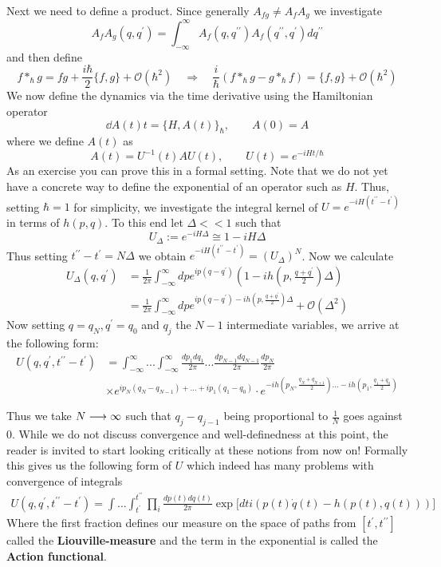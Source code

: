 \begin{example}
  Next we need to define a product. Since generally $A_{fg} \neq A_f A_g$ we investigate
  $$ A_f A_g (q, q^\prime) = \int_{-\infty}^\infty A_f(q, q^{\prime \prime}) A_f(q^{\prime \prime},q^\prime) dq^{\prime \prime} $$
  and then define
  $$ f *_\hbar g = fg + \frac{i\hbar}{2} \{f,g\} + \mathcal{O}(\hbar^2) \quad \Rightarrow \quad \frac{i}{\hbar} (f *_\hbar g - g *_\hbar f) = \{f,g\} + \mathcal{O}(\hbar^2)$$
  We now define the dynamics via the time derivative using the Hamiltonian operator
  $$ \dd{A(t)}{t} = \{H, A(t)\}_\hbar , \quad \quad A(0) = A $$
  where we define $A(t)$ as
  $$ A(t) = U^{-1}(t) A U(t), \quad \quad U(t) = e^{-i H t / \hbar} $$
  As an exercise you can prove this in a formal setting. Note that we do not yet have a concrete way to define the exponential of an operator such as $H$. Thus, setting $\hbar = 1$ for simplicity, we investigate the integral kernel of $U = e^{-iH(t^{\prime \prime} - t^\prime)}$ in terms of $h(p,q)$. To this end let $\Delta << 1$ such that
  $$ U_\Delta := e^{-i H \Delta} \cong 1- i H \Delta $$
  Thus setting $t^{\prime \prime} - t^\prime = N \Delta$ we obtain $e^{-iH(t^{\prime \prime} - t^\prime)} = (U_\Delta)^N$. Now we calculate
  \begin{align*}
    U_\Delta(q,q^\prime) &= \frac{1}{2\pi} \int_{-\infty}^\infty dp e^{ip(q-q^\prime)} \left( 1- i h\left(p, \frac{q+q^\prime}{2} \right) \Delta \right) \\
    &= \frac{1}{2\pi} \int_{-\infty}^\infty dp e^{ip(q-q^\prime) - i h\left(p, \frac{q+q^\prime}{2} \right) \Delta} + \mathcal{O}(\Delta^2)
  \end{align*}
  Now setting $q = q_N, q^\prime = q_0$ and $q_j$ the $N-1$ intermediate variables, we arrive at the following form:
  \begin{align*}
    U(q, q^\prime, t^{\prime\prime}-t^\prime) &= \int_{-\infty}^\infty ... \int_{-\infty}^\infty \frac{dp_1 dq_1}{2\pi} ... \frac{dp_{N-1} dq_{N-1}}{2\pi} \frac{dp_N}{2\pi}\\
    &\times e^{ip_{N}(q_{N}-q_{N-1}) + ... + ip_1(q_1-q_0)} \cdot e^{-ih\left(p_N, \frac{q_N + q_{N+1}}{2}\right) ... -ih\left( p_1, \frac{q_1 + q_0}{2} \right)}
  \end{align*}

  Thus we take $N\longrightarrow \infty$ such that $q_j - q_{j-1}$ being proportional to $\frac{1}{N}$ goes against $0$. While we do not discuss convergence and well-definedness at this point, the reader is invited to start looking critically at these notions from now on! Formally this gives us the following form of $U$ which indeed has many problems with convergence of integrals
  \begin{align*}
    U(q,q^\prime, t^{\prime\prime}-t^\prime) = \int ... \int_{t^\prime}^{t^{\prime\prime}} \prod_i \frac{dp(t) dq(t)}{2\pi} \exp\Big[dt i ( p(t)\dot q(t) - h(p(t),q(t)))\Big]
  \end{align*}
  Where the first fraction defines our measure on the space of paths from $[t^\prime, t^{\prime\prime}]$ called the \textbf{Liouville-measure} and the term in the exponential is called the \textbf{Action functional}.\\


\end{example}
